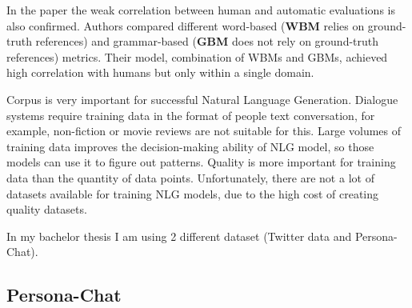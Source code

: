 In the paper \cite{novikova2017we} the weak correlation between human and automatic evaluations is also confirmed. Authors compared different word-based (\textbf{WBM} relies on ground-truth references) and grammar-based (\textbf{GBM} does not rely on ground-truth references) metrics. Their model, combination of WBMs and GBMs, achieved high correlation with humans but only within a single domain.

Corpus is very important for successful Natural Language Generation. Dialogue systems require training data in the format of people text conversation, for example, non-fiction or movie reviews are not suitable for this. Large volumes of training data improves the decision-making ability of NLG model, so those models can use it to figure out patterns. Quality is more important for training data than the quantity of data points. Unfortunately, there are not a lot of datasets available for training NLG models, due to the high cost of creating quality datasets. 

In my bachelor thesis I am using 2 different dataset (Twitter data and Persona-Chat). 

\subsection{Persona-Chat} \label{persona_chat_subsec}

